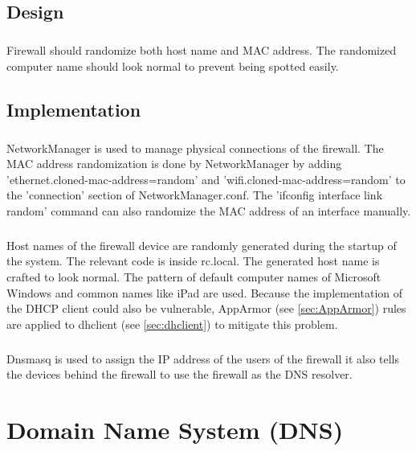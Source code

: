 \documentclass[mscthesis]{usiinfthesis}
\begin{document}
\section{Design}
\paragraph{}
Firewall should randomize both host name and MAC address. The randomized computer name should look normal to prevent being spotted easily.


\section{Implementation}
\paragraph{}
NetworkManager is used to manage physical connections of the firewall. The MAC address randomization is done by NetworkManager by adding 'ethernet.cloned-mac-address=random' and 'wifi.cloned-mac-address=random' to the 'connection' section of NetworkManager.conf. The 'ifconfig interface link random' command can also randomize the MAC address of an interface manually.
\paragraph{}
Host names of the firewall device are randomly generated during the startup of the system. The relevant code is inside rc.local. The generated host name is crafted to look normal. The pattern of default computer names of Microsoft Windows and common names like iPad are used. Because the implementation of the DHCP client could also be vulnerable, AppArmor (see \cref{sec:AppArmor}) rules are applied to dhclient (see \cref{sec:dhclient}) to mitigate this problem.
\paragraph{}
Dnsmasq is used to assign the IP address of the users of the firewall it also tells the devices behind the firewall to use the firewall as the DNS resolver.

\chapter{Domain Name System (DNS)}\label{cha:dns}
\end{document}
